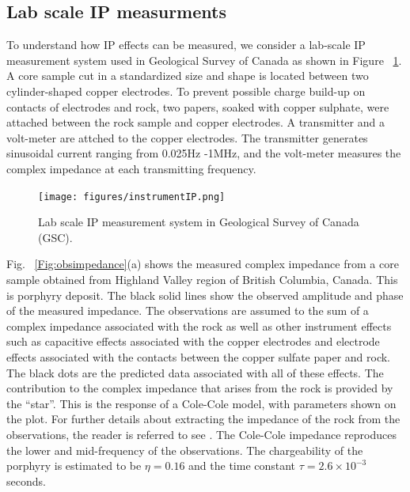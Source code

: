\documentclass[letterpaper,11pt]{article}
\begin{document}
\subsection{Lab scale IP measurments}
To understand how IP effects can be measured, we consider a lab-scale IP measurement system used in Geological Survey of Canada \cite[]{Enkin2012} as shown in Figure ~\ref{Fig:instrumentIP}. A core sample cut in a standardized size and shape is located between two cylinder-shaped copper electrodes. To prevent possible charge build-up on contacts of electrodes and rock, two papers, soaked with copper sulphate, were attached between the rock sample and copper electrodes. A transmitter and a volt-meter are attched to the copper electrodes. The transmitter generates sinusoidal current ranging from 0.025Hz -1MHz, and the volt-meter measures the complex impedance at each transmitting frequency. 
\begin{figure}[htb]
  \centering
  \texttt{[image: figures/instrumentIP.png]}
  \caption{Lab scale IP measurement system in Geological Survey of Canada (GSC). }
  \label{Fig:instrumentIP}
\end{figure}

Fig. ~\ref{Fig:obsimpedance}(a) shows the measured complex impedance from a core sample obtained from Highland Valley region of British Columbia, Canada. This is porphyry deposit. The black solid lines show the observed amplitude and phase of the measured impedance. The observations are assumed to the sum of a complex impedance associated with the rock as well as other instrument effects such as capacitive effects associated with the copper electrodes and electrode effects associated with the contacts between the copper sulfate paper and rock. The black dots are the predicted data associated with all of these effects. The contribution to the complex impedance that arises from the rock is provided by the ``star''. This is the response of a Cole-Cole model, with parameters shown on the plot.  For further details about extracting the impedance of the rock from the observations, the reader is referred to see \cite{Enkin2012}. The Cole-Cole impedance reproduces the lower and mid-frequency of the observations. The chargeability of the porphyry is estimated to be $\eta=0.16$ and the time constant $\tau=2.6\times10^{-3}$ seconds. 

\end{document}
